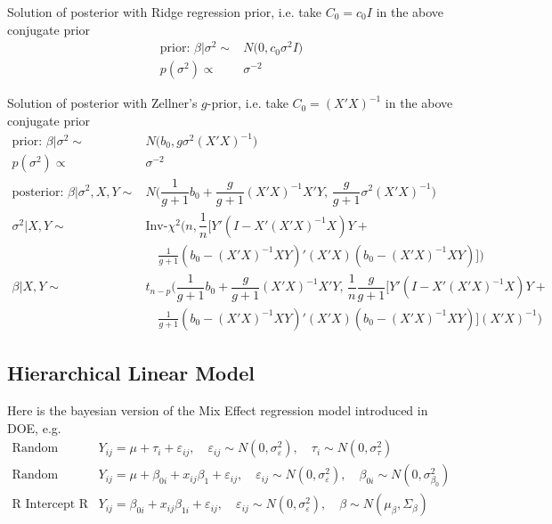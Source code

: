 Solution of posterior with Ridge regression prior, i.e. take $ C_0=c_0I $ in the above conjugate prior
\begin{align}
    \text{prior: }\beta |\sigma ^2\sim& N\big(0, c_0\sigma ^2I \big)\\
    p(\sigma ^2)\propto & \sigma ^{-2}
\end{align}

Solution of posterior with Zellner's $ g $-prior, i.e. take $ C_0=(X'X)^{-1} $ in the above conjugate prior
\begin{align}
    \text{prior: }\beta |\sigma ^2\sim& N\big(b_0, g\sigma ^2(X'X)^{-1} \big)\\
    p(\sigma ^2)\propto & \sigma ^{-2}\\
    \text{posterior: }\beta |\sigma ^2,X,Y\sim& N\big( \dfrac{ 1 }{ g+1 }b_0+\dfrac{ g }{ g+1 }(X'X)^{-1}X'Y,\, \dfrac{ g }{ g+1 }\sigma ^2(X'X)^{-1}    \big)\\
    \sigma ^2|X,Y\sim &\mathrm{Inv}\text{-}\chi^2\big( n,\dfrac{ 1 }{ n }\big[ Y'(I-X'(X'X)^{-1}X)Y+\\
    &\quad
     \frac{1}{g+1}(b_0-(X'X)^{-1}XY)'(X'X)(b_0-(X'X)^{-1}XY)  \big]  \big)\\
    \beta |X,Y\sim &t_{n-p}\big( \dfrac{ 1 }{ g+1 }b_0+\dfrac{ g }{ g+1 }(X'X)^{-1}X'Y,\, \dfrac{ 1 }{ n }\dfrac{ g }{ g+1 }\big[ Y'(I-X'(X'X)^{-1}X)Y+\\
    &\quad
    \frac{1}{g+1}(b_0-(X'X)^{-1}XY)'(X'X)(b_0-(X'X)^{-1}XY)  \big](X'X)^{-1}   \big)
\end{align}


\subsection{Hierarchical Linear Model}
Here is the bayesian version of the Mix Effect regression model introduced in DOE, e.g.
\begin{align}
    \text{Random Effect: }&Y_{ij}=\mu + \tau_i + \varepsilon _{ij},\quad \varepsilon _{ij}\sim N(0,\sigma _\varepsilon ^2),\quad \tau_i\sim N(0,\sigma _\tau^2)\\
    \text{Random Intercept: }&Y_{ij}=\mu+ \beta _{0i} +x_{ij}\beta_1 + \varepsilon _{ij},\quad \varepsilon _{ij}\sim N(0,\sigma ^2_\varepsilon ),\quad \beta _{0i}\sim N(0,\sigma ^2_{\beta_0 })\\
    \text{R Intercept R Slope: }&Y_{ij}=\beta _{0i}+x_{ij}\beta _{1i}+\varepsilon _{ij},\quad \varepsilon _{ij}\sim N(0,\sigma ^2_{\varepsilon }),\quad \beta \sim N(\mu _\beta ,\Sigma _\beta )
\end{align}









